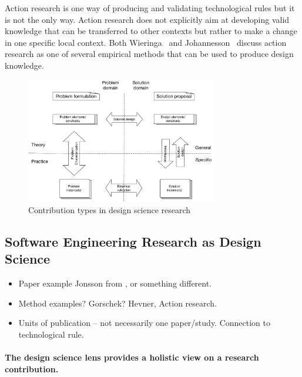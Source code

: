 \documentclass[graybox]{svmult}
\begin{document}
Action research is one way of producing and validating technological rules but it is not the only way. Action research does not explicitly aim at developing valid knowledge that can be transferred to other contexts but rather to make a change in one specific local context. Both Wieringa~\cite{wieringa_technical_2012} and Johannesson~\cite{johannesson_introduction_2014} discuss action research as one of several empirical methods that can be used to produce design knowledge.


\begin{figure}
  \includegraphics[width=0.75\textwidth]{Figures/DS_model.pdf}
\caption{Contribution types in design science research}
\label{fig:contributiontypes}       %
\end{figure}



\subsection{Software Engineering Research as Design Science}
\begin{itemize}
\item Paper example Jonsson \cite{JonssonBug15} from \cite{StoreyESEM17}, or something different.
\item Method examples? Gorschek? \cite{GorschekSW2006} Hevner, Action research.
\item Units of publication -- not necessarily one paper/study. Connection to technological rule.
\end{itemize}

\paragraph{The design science lens provides a holistic view on a research contribution.} 
\end{document}
